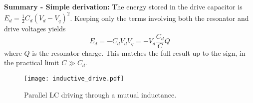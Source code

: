 \textbf{Summary - Simple derivation:} The energy stored in the drive capacitor is $E_d = \frac{1}{2}C_d\left( V_d - V_q \right)^2$.
Keeping only the terms involving both the resonator and drive voltages yields
\begin{equation*}
  E_d = - C_d V_d V_q = - V_d \frac{C_d}{C} Q
\end{equation*}
where $Q$ is the resonator charge.
This matches the full result up to the sign, in the practical limit $C \gg C_d$.



\begin{figure}
\begin{centering}
\texttt{[image: inductive\_drive.pdf]}
\par\end{centering}
  \caption{Parallel LC driving through a mutual inductance.}
\label{fig:qubits.inductive_drive}
\end{figure}

